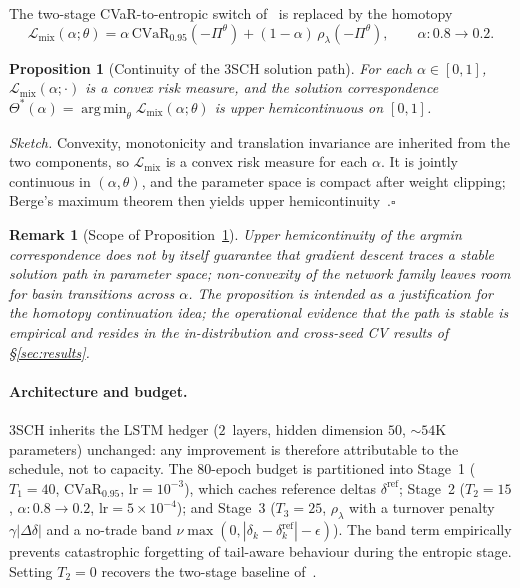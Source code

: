 \documentclass[10pt,letterpaper]{article}
\newcommand{\cvar}{\mathrm{CVaR}}
\newcommand{\argmin}{\mathop{\mathrm{arg\,min}}}
\newtheorem{proposition}{Proposition}
\newtheorem{remark}{Remark}
\begin{document}
The two-stage CVaR-to-entropic switch of~\citet{kozyra2019deep} is
replaced by the homotopy
\begin{equation}
\mathcal{L}_{\mathrm{mix}}(\alpha;\theta) =
\alpha\,\cvar_{0.95}(-\Pi^\theta) + (1-\alpha)\,\rho_\lambda(-\Pi^\theta),
\qquad \alpha:0.8\to 0.2.
\label{eq:homotopy}
\end{equation}

\begin{proposition}[Continuity of the 3SCH solution path]\label{prop:3sch}
For each $\alpha\in[0,1]$,
$\mathcal{L}_{\mathrm{mix}}(\alpha;\cdot)$ is a convex risk measure,
and the solution correspondence
$\Theta^*(\alpha)=\argmin_\theta\mathcal{L}_{\mathrm{mix}}(\alpha;\theta)$
is upper hemicontinuous on $[0,1]$.
\end{proposition}

\noindent\textit{Sketch.}
Convexity, monotonicity and translation invariance are inherited
from the two components, so $\mathcal{L}_{\mathrm{mix}}$ is a convex
risk measure for each $\alpha$. It is jointly continuous in
$(\alpha,\theta)$, and the parameter space is compact after weight
clipping; Berge's maximum theorem then yields upper
hemicontinuity~\citep{aliprantis2006infinite}.\hfill$\square$

\begin{remark}[Scope of Proposition~\ref{prop:3sch}]\label{rem:3sch_scope}
Upper hemicontinuity of the argmin correspondence does not by itself
guarantee that gradient descent traces a stable solution path in
parameter space; non-convexity of the network family leaves room for
basin transitions across $\alpha$. The proposition is intended as a
justification for the homotopy continuation idea; the operational
evidence that the path is stable is empirical and resides in the
in-distribution and cross-seed CV results of \S\ref{sec:results}.
\end{remark}

\paragraph{Architecture and budget.}
3SCH inherits the LSTM hedger ($2$~layers, hidden dimension $50$,
$\sim 54$K parameters) unchanged: any improvement is therefore
attributable to the schedule, not to capacity. The $80$-epoch
budget is partitioned into
Stage~1 ($T_1=40$, $\cvar_{0.95}$, $\mathrm{lr}=10^{-3}$), which
caches reference deltas $\delta^{\mathrm{ref}}$;
Stage~2 ($T_2=15$, $\alpha:0.8\to 0.2$,
$\mathrm{lr}=5\times 10^{-4}$); and
Stage~3 ($T_3=25$, $\rho_\lambda$ with a turnover penalty
$\gamma|\Delta\delta|$ and a no-trade band
$\nu\max(0,|\delta_k-\delta_k^{\mathrm{ref}}|-\epsilon)$).
The band term empirically prevents catastrophic forgetting of
tail-aware behaviour during the entropic stage. Setting
$T_2\!=\!0$ recovers the two-stage baseline
of~\citet{kozyra2019deep}.
\end{document}
